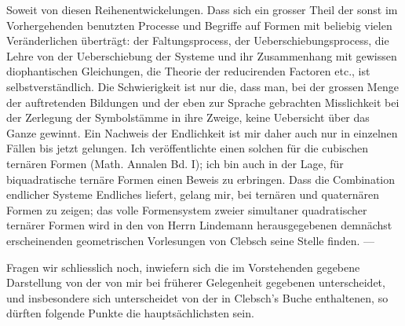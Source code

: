 \documentclass[10pt]{article}
\begin{document}
Soweit von diesen Reihenentwickelungen. Dass sich ein grosser Theil der sonst im Vorhergehenden benutzten Processe und Begriffe auf Formen mit beliebig vielen Veränderlichen überträgt: der Faltungsprocess, der Ueberschiebungsprocess, die Lehre von der Ueberschiebung der Systeme und ihr Zusammenhang mit gewissen diophantischen Gleichungen, die Theorie der reducirenden Factoren etc., ist selbstverständlich. Die Schwierigkeit ist nur die, dass man, bei der grossen Menge der auftretenden Bildungen und der eben zur Sprache gebrachten Misslichkeit bei der Zerlegung der Symbolstämme in ihre Zweige, keine Uebersicht über das Ganze gewinnt. Ein Nachweis der Endlichkeit ist mir daher auch nur in einzelnen Fällen bis jetzt gelungen. Ich veröffentlichte einen solchen für die cubischen ternären Formen (Math. Annalen Bd. I); ich bin auch in der Lage, für biquadratische ternäre Formen einen Beweis zu erbringen. Dass die Combination endlicher Systeme Endliches liefert, gelang mir, bei ternären und quaternären Formen zu zeigen; das volle Formensystem zweier simultaner quadratischer ternärer Formen wird in den von Herrn Lindemann herausgegebenen demnächst erscheinenden geometrischen Vorlesungen von Clebsch seine Stelle finden. ---

Fragen wir schliesslich noch, inwiefern sich die im Vorstehenden gegebene Darstellung von der von mir bei früherer Gelegenheit gegebenen unterscheidet, und insbesondere sich unterscheidet von der in Clebsch's Buche enthaltenen, so dürften folgende Punkte die hauptsächlichsten sein.
\end{document}

